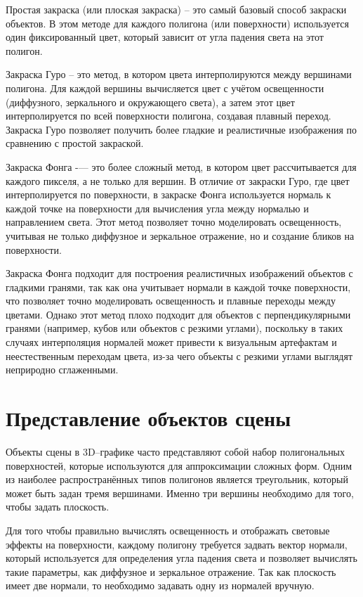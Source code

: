 Простая закраска (или плоская закраска) -- это самый базовый способ закраски объектов. В этом методе для каждого полигона (или поверхности) используется один фиксированный цвет, который зависит от угла падения света на этот полигон.

Закраска Гуро -- это метод, в котором цвета интерполируются между вершинами полигона. Для каждой вершины вычисляется цвет с учётом освещенности (диффузного, зеркального и окружающего света), а затем этот цвет интерполируется по всей поверхности полигона, создавая плавный переход. Закраска Гуро позволяет получить более гладкие и реалистичные изображения по сравнению с простой закраской.

Закраска Фонга -— это более сложный метод, в котором цвет рассчитывается для каждого пикселя, а не только для вершин. В отличие от закраски Гуро, где цвет интерполируется по поверхности, в закраске Фонга используется нормаль к каждой точке на поверхности для вычисления угла между нормалью и направлением света. Этот метод позволяет точно моделировать освещенность, учитывая не только диффузное и зеркальное отражение, но и создание бликов на поверхности.

Закраска Фонга подходит для построения реалистичных изображений объектов с гладкими гранями, так как она учитывает нормали в каждой точке поверхности, что позволяет точно моделировать освещенность и плавные переходы между цветами. Однако этот метод плохо подходит для объектов с перпендикулярными гранями (например, кубов или объектов с резкими углами), поскольку в таких случаях интерполяция нормалей может привести к визуальным артефактам и неестественным переходам цвета, из-за чего объекты с резкими углами выглядят неприродно сглаженными.

\section{Представление объектов сцены}
Объекты сцены в 3D--графике часто представляют собой набор полигональных поверхностей, которые используются для аппроксимации сложных форм. Одним из наиболее распространённых типов полигонов является треугольник, который может быть задан тремя вершинами. Именно три вершины необходимо для того, чтобы задать плоскость.

Для того чтобы правильно вычислять освещенность и отображать световые эффекты на поверхности, каждому полигону требуется задвать вектор нормали, который используется для определения угла падения света и позволяет вычислять такие параметры, как диффузное и зеркальное отражение. Так как плоскость имеет две нормали, то необходимо задавать одну из нормалей вручную. 





